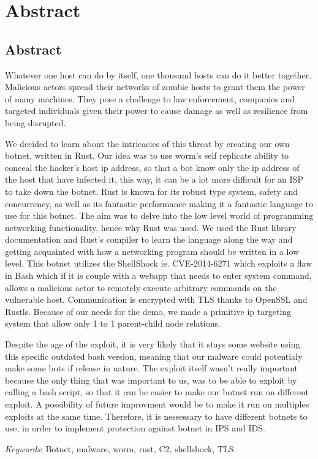 \documentclass[../main.tex]{subfiles}
\begin{document}
    \newpage

	\chapter*{Abstract}

    \section*{Abstract}

    Whatever one host can do by itself, one thousand hosts can do it better together. 
    Malicious actors spread their networks of zombie hosts to grant them the power of many machines.
    They pose a challenge to law enforcement, companies and targeted individuals given their power to cause damage as well as resilience from being disrupted.

    We decided to learn about the intricacies of this threat by creating our own botnet, written in Rust. 
    Our idea was to use worm's self replicate ability to conceal the hacker's host ip address, so that a bot know only the ip address of the host that have infected it, this way, it can be a lot more difficult for an ISP to take down the botnet.
    Rust is known for its robust type system, safety and concurrency, as well as its fantastic performance making it a fantastic language to use for this botnet.
    The aim was to delve into the low level world of programming networking functionality, hence why Rust was used. 
    We used the Rust library documentation and Rust's compiler to learn the language along the way and getting acquainted with how a networking program should be written in a low level.
    This botnet utilizes the ShellShock ie. CVE-2014-6271 which exploits a flaw in Bash which if it is couple with a webapp that needs to enter system command, allows a malicious actor to remotely execute arbitrary commands on the vulnerable host.
    Communication is encrypted with TLS thanks to OpenSSL and Rustls. 
    Because of our needs for the demo, we made a primitive ip targeting system that allow only 1 to 1 parent-child node relations.

    Despite the age of the exploit, it is very likely that it stays some website using this specific outdated bash version, meaning that our malware could potentialy make some bots if release in nature. 
    The exploit itself wasn't really important because the only thing that was important to us, was to be able to exploit by calling a bash script, so that it can be easier to make our botnet run on different exploit. 
    A possibility of future improvment would be to make it run on multiples exploits at the same time.
    Therefore, it is nessessary to have different botnets to use, in order to implement protection against botnet in IPS and IDS.


	\vspace{10pt}

	\qquad \textit{Keywords}: Botnet, malware, worm, rust, C2, shellshock, TLS.
\end{document}
